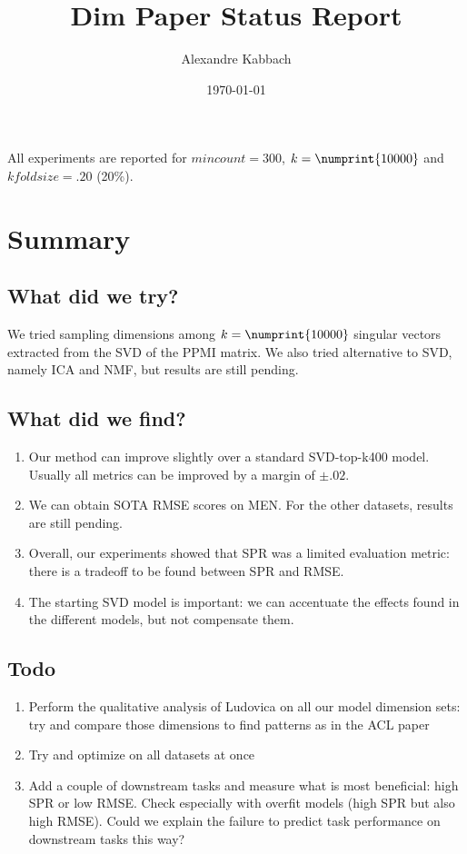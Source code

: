 \documentclass[utf8]{article}
\title{Dim Paper Status Report}
\author{Alexandre Kabbach}
\date{\today}
\begin{document}
\maketitle


All experiments are reported for $mincount=300$, $k=\numprint{10000}$ and
$kfoldsize=.20$ (20\%).


\section{Summary}

\subsection{What did we try?}
We tried sampling dimensions among $k=\numprint{10000}$ singular vectors extracted from the SVD of the PPMI matrix. We also tried alternative to SVD, namely ICA and NMF, but results are still pending.

\subsection{What did we find?}
\begin{enumerate}
  \item Our method can improve slightly over a standard SVD-top-k400 model. Usually all metrics can be improved by a margin of $\pm.02$.
  \item We can obtain SOTA RMSE scores on MEN. For the other datasets, results are still pending.
  \item Overall, our experiments showed that SPR was a limited evaluation metric: there is a tradeoff to be found between SPR and RMSE.
  \item The starting SVD model is important: we can accentuate the effects found in the different models, but not compensate them.
\end{enumerate}

\subsection{Todo}
\begin{enumerate}
  \item Perform the qualitative analysis of Ludovica on all our model dimension sets: try and compare those dimensions to find patterns as in the ACL paper
  \item Try and optimize on all datasets at once
  \item Add a couple of downstream tasks and measure what is most beneficial: high SPR or low RMSE. Check especially with overfit models (high SPR but also high RMSE). Could we explain the failure to predict task performance on downstream tasks this way?
\end{enumerate}
\end{document}
